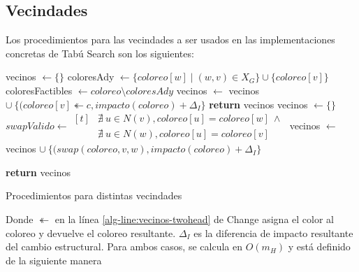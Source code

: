 \subsection{Vecindades}

Los procedimientos para las vecindades a ser usados en las implementaciones concretas de Tabú Search son los siguientes:

\begin{algorithm}[H]
    \begin{algorithmic}[1]
         
            \State vecinos $\gets \{\}$
             
                \State coloresAdy $\gets \{ coloreo[w] \mid (w, v) \in X_G\} \cup \{ coloreo[v] \}$ 
                \State coloresFactibles $\gets coloreo \setminus coloresAdy$ 
                \State vecinos $\gets$ vecinos $\cup\ \{(coloreo[v] \twoheadleftarrow c, impacto(coloreo) + \Delta_I\}$  \label{alg-line:vecinos-twohead}
                \EndFor 
            \EndFor
            \State \textbf{return} vecinos
            \EndFor
        \EndFunction
         
            \State vecinos $\gets \{\}$
             
                    \State $swapValido \gets \begin{aligned}[t]
                        &\nexists\ u \in N(v), coloreo[u] = coloreo[w]\ \wedge \\
                        &\nexists\ u \in N(w), coloreo[u] = coloreo[v]
                    \end{aligned}$  
                        \State vecinos $\gets$ vecinos $\cup\ \{(swap(coloreo, v, w), impacto(coloreo) + \Delta_I\}$ 
                    \EndIf
                \EndFor
            \EndFor
                
            \State \textbf{return} vecinos
            \EndFor
        \EndFunction
    \end{algorithmic}
    \caption{Procedimientos para distintas vecindades}
    \label{alg:tabu-proc-vecindad}
\end{algorithm}

Donde $\twoheadleftarrow$ en la línea \ref{alg-line:vecinos-twohead} de Change asigna el color al coloreo y devuelve el coloreo resultante. $\Delta_I$ es la diferencia de impacto resultante del cambio estructural. Para ambos casos, se calcula en $O(m_H)$ y está definido de la siguiente manera

